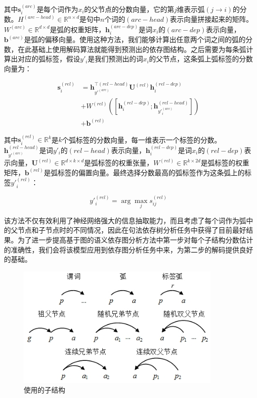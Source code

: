 其中$\mathbf{s}^{(arc)}_i$是每个词作为$x_i$的父节点的分数向量，它的第$j$维表示弧$(j\rightarrow i)$的分数。$H^{(arc-head)} \in \mathbb{R}^{n \times d}$是句中$n$个词的$(arc-head)$表示向量拼接起来的矩阵。$W^{(arc)} \in \mathbb{R}^{d \times d}$是弧的权重矩阵，$\mathbf{h}^{(arc-dep)}_i$是词$x_i$的$(arc-dep)$表示向量，$\mathbf{b}^{(arc)}$是弧的偏移向量。使用这种方法，我们能够计算出任意两个词之间的弧的分数，在此基础上使用解码算法就能得到预测出的依存图结构。之后需要为每条弧计算出对应的弧标签，假设$y'_i$是我们预测出的词$x_i$的父节点，这条弧上弧标签的分数向量为：

\begin{equation}
\begin{split}
\mathbf{s}^{(rel)}_i & = \mathbf{h}_{y'^{(arc)}}^{\top(rel-head)}\mathbf{U}^{(rel)}\mathbf{h}^{(rel-dep)}_i \\
& + W^{(rel)}([\mathbf{h}^{(rel-dep)}_i; \mathbf{h}^{(rel-head)}_{y'^{(arc)}_i}]) \\
& + \mathbf{b}^{(rel)}
\end{split}
\end{equation}

其中$\mathbf{s}^{(rel)}_i \in \mathbb{R}^{k}$是$k$个弧标签的分数向量，每一维表示一个标签的分数。$\mathbf{h}_{y'^{(arc)}}^{(rel-head)}$是词$y'_i$的$(rel-head)$表示向量，$\mathbf{h}^{(rel-dep)}_i$是词$x_i$的$(rel-dep)$表示向量，$\mathbf{U}^{(rel)} \in \mathbb{R}^{d\times k \times d}$是弧标签的权重张量，$W^{(rel)} \in \mathbb{R}^{k \times 2d}$是弧标签的权重矩阵，$\mathbf{b}^{(rel)}$是弧标签的偏置向量。最终选择分数最高的弧标签作为这条弧上的标签$y'^{(rel)}_i$：

\begin{equation}
y'^{(rel)}_i = \arg \max_j s^{(rel)}_{ij}
\end{equation}

该方法不仅有效利用了神经网络强大的信息抽取能力，而且考虑了每个词作为弧中的父节点和子节点时的不同情况，因此在句法依存树分析任务中获得了目前最好结果。为了进一步提高基于图的语义依存图分析方法中第一步对每个子结构分数估计的准确性，我们会将该模型应用到依存图分析任务中来，为第二步的解码提供良好的基础。

\begin{figure}[hbtp]
	\centering
	\includegraphics[width=100mm]{picture/parts.jpg}
	\caption{使用的子结构}
	\label{fig:parts}
\end{figure}

